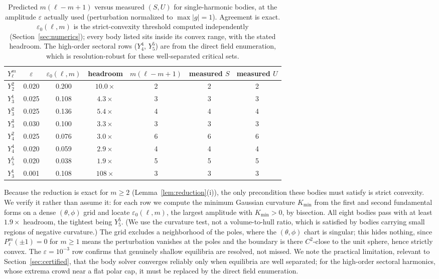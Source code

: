 \documentclass[11pt,a4paper]{article}
\theoremstyle{definition}
\begin{document}
\begin{table}[h]
\centering
\caption{Predicted $m(\ell-m+1)$ versus measured $(S,U)$ for single-harmonic bodies, at the amplitude
$\varepsilon$ actually used (perturbation normalized to $\max\lvert g\rvert=1$). Agreement is exact.
$\varepsilon_0(\ell,m)$ is the strict-convexity threshold computed independently (Section~\ref{sec:numerics});
every body listed sits inside its convex range, with the stated headroom. The high-order sectoral rows
($Y_4^4$, $Y_5^5$) are from the direct field enumeration, which is resolution-robust for these well-separated
critical sets.}
\begin{tabular}{lcccccc}
\toprule
$Y_\ell^m$ & $\varepsilon$ & $\varepsilon_0(\ell,m)$ & headroom & $m(\ell-m+1)$ & measured $S$ & measured $U$ \\
\midrule
$Y_2^2$ & 0.020 & 0.200 & $10.0\times$ & 2 & 2 & 2 \\
$Y_3^1$ & 0.025 & 0.108 & $4.3\times$  & 3 & 3 & 3 \\
$Y_3^2$ & 0.025 & 0.136 & $5.4\times$  & 4 & 4 & 4 \\
$Y_3^3$ & 0.030 & 0.100 & $3.3\times$  & 3 & 3 & 3 \\
$Y_4^2$ & 0.025 & 0.076 & $3.0\times$  & 6 & 6 & 6 \\
$Y_4^4$ & 0.020 & 0.059 & $2.9\times$  & 4 & 4 & 4 \\
$Y_5^5$ & 0.020 & 0.038 & $1.9\times$  & 5 & 5 & 5 \\
$Y_3^1$ & 0.001 & 0.108 & $108\times$  & 3 & 3 & 3 \\
\bottomrule
\end{tabular}
\end{table}

Because the reduction is exact for $m\ge2$ (Lemma~\ref{lem:reduction}(i)), the only precondition these bodies
must satisfy is strict convexity. We verify it rather than assume it: for each row we compute the minimum
Gaussian curvature $K_{\min}$ from the first and second fundamental forms on a dense $(\theta,\phi)$ grid and
locate $\varepsilon_0(\ell,m)$, the largest amplitude with $K_{\min}>0$, by bisection. All eight bodies pass
with at least $1.9\times$ headroom, the tightest being $Y_5^5$. (We use the curvature test, not a
volume-to-hull ratio, which is satisfied by bodies carrying small regions of negative curvature.) The grid
excludes a neighborhood of the poles, where the $(\theta,\phi)$ chart is singular; this hides nothing, since
$P_\ell^m(\pm1)=0$ for $m\ge1$ means the perturbation vanishes at the poles and the boundary is there $C^2$-close
to the unit sphere, hence strictly convex. The
$\varepsilon=10^{-3}$ row confirms that genuinely shallow equilibria are resolved, not missed. We note the
practical limitation, relevant to Section~\ref{sec:certified}, that the body solver converges reliably only when
equilibria are well separated; for the high-order sectoral harmonics, whose extrema crowd near a flat polar
cap, it must be replaced by the direct field enumeration.
\end{document}
